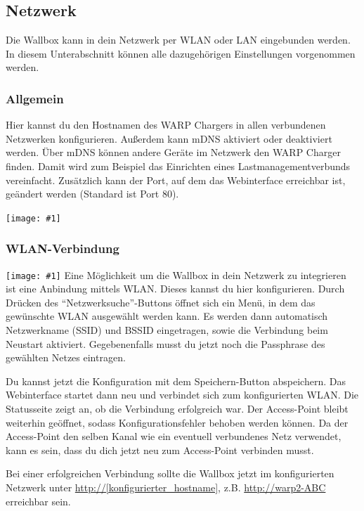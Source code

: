 \documentclass[a4paper,10pt]{article}
\newcommand{\gfx}[1]{\texttt{[image: \#1]}}
\begin{document}
\begin{multicols*}{2}
    \subsection{Netzwerk}\label{network}
    Die Wallbox kann in dein Netzwerk per WLAN oder LAN eingebunden werden.
    In diesem Unterabschnitt können alle dazugehörigen Einstellungen vorgenommen werden.

    \subsubsection{Allgemein}
    Hier kannst du den Hostnamen des WARP Chargers in allen verbundenen Netzwerken konfigurieren. Außerdem kann mDNS aktiviert oder deaktiviert werden.
    Über mDNS können andere Geräte im Netzwerk den WARP Charger finden. Damit
    wird zum Beispiel das Einrichten eines Lastmanagementverbunds vereinfacht.
    Zusätzlich kann der Port, auf dem das Webinterface erreichbar ist, geändert werden (Standard ist
    Port 80).

    \gfx{./img_warp2/resized/web_network}


    \subsubsection{WLAN-Verbindung}
    \gfx{./img_warp2/resized/web_wifi_sta}
    Eine Möglichkeit um die Wallbox in dein Netzwerk zu integrieren ist eine
    Anbindung mittels WLAN. Dieses kannst du hier konfigurieren.
    Durch Drücken des \enquote{Netzwerksuche}-Buttons öffnet sich ein Menü, in dem das gewünschte WLAN ausgewählt werden kann.
    Es werden dann automatisch Netzwerkname (SSID) und BSSID eingetragen, sowie die Verbindung beim Neustart aktiviert.
    Gegebenenfalls musst du jetzt noch die Passphrase des gewählten Netzes eintragen.

    \vspace{-0.1cm}
    Du kannst jetzt die Konfiguration mit dem Speichern-Button abspeichern.
    Das Webinterface startet dann neu und verbindet sich zum konfigurierten WLAN. Die Statusseite zeigt
    an, ob die Verbindung erfolgreich war. Der Access-Point bleibt weiterhin
    geöffnet, sodass Konfigurationsfehler behoben werden können.
    Da der Access-Point den selben Kanal wie ein eventuell verbundenes Netz verwendet,
    kann es sein, dass du dich jetzt neu zum Access-Point verbinden musst.

    \vspace{-0.1cm}
    Bei einer erfolgreichen Verbindung sollte die Wallbox jetzt im konfigurierten Netzwerk unter
    \url{http://[konfigurierter_hostname]}, z.B. \url{http://warp2-ABC} erreichbar sein.


\end{multicols*}
\end{document}
